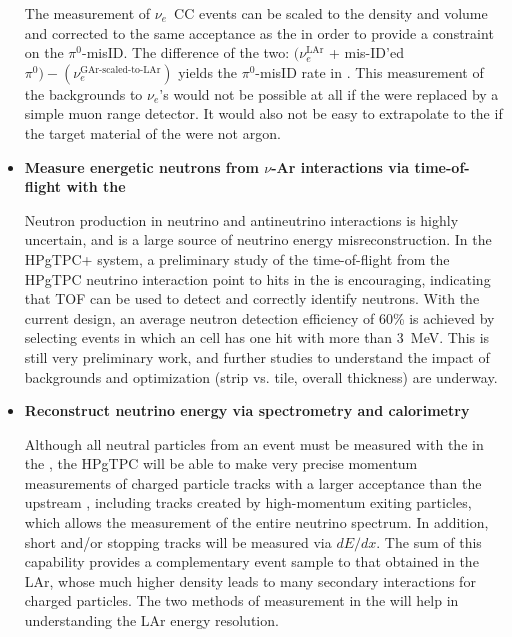 \begin{itemize}
{The  measurement of $\nu_e$~CC events can be scaled to the  density and volume and corrected to the same acceptance as the  in order to provide a constraint on the $\pi^0$-misID. The difference of the two: $(\nu_e^{{\textrm{LAr}}}$ + mis-ID'ed~$\pi^0)-(\nu_e^{\textrm{GAr-scaled-to-LAr}})$ yields the $\pi^0$-misID rate in . This measurement of the backgrounds to $\nu_e$'s would not be possible at all if the  were replaced by a simple muon range detector. It would also not be easy to extrapolate to the  if the target material of the  were not argon.

}

\item{{\bf Measure energetic neutrons from $\nu$-Ar interactions via time-of-flight with the }

Neutron production in neutrino and antineutrino interactions is highly uncertain, and is a large source of neutrino energy misreconstruction. In the HPgTPC+ system, a preliminary study of the time-of-flight from the HPgTPC neutrino interaction point to hits in the  is encouraging, indicating that TOF can be used to detect and correctly identify neutrons.  With the current  design, an average neutron detection efficiency of 60\% is achieved by selecting events in which an  cell has one hit with more than 3~MeV. This is still very preliminary work, and further studies to understand the impact of backgrounds and  optimization (strip vs. tile, overall thickness) are underway.
    
}

\item{{\bf Reconstruct neutrino energy via spectrometry and calorimetry}
    
Although all neutral particles from an event must be measured with the  in the , the HPgTPC will be able to make very precise momentum measurements of charged particle tracks with a larger acceptance than the upstream , including tracks created by high-momentum exiting particles, which allows the measurement of the entire neutrino spectrum.  In addition, short and/or stopping tracks will be measured via $dE/dx$.  The sum of this capability provides a complementary event sample to that obtained in the LAr, whose much higher density leads to many secondary interactions for charged particles. The two methods of measurement in the  will help in understanding the LAr energy resolution.
}


\end{itemize}
